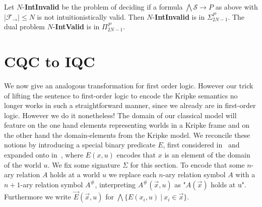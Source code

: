 \documentclass[a4paper,UKenglish,cleveref, autoref, thm-restate]{lipics-v2021}
\begin{document}
\begin{corollary}
	Let $N$-\textbf{IntInvalid} be the problem of deciding if a formula $\bigwedge \mathcal S\to P$ as above with $|\mathcal F_\to|\leq N$ is not intuitionistically valid. Then $N$-\textbf{IntInvalid} is in $\Sigma_{2N-1}^P$. The dual problem $N$-\textbf{IntValid} is in $\Pi_{2N-1}^P$.
\end{corollary}


\section{CQC to IQC}

We now give an analogous transformation for first order logic. However our trick of lifting the sentence to first-order logic to encode the Kripke semantics no longer works in such a straightforward manner, since we already are in first-order logic. However we do it nonetheless! The domain of our classical model will feature on the one hand elements representing worlds in a Kripke frame and on the other hand the domain-elements from the Kripke model. We reconcile these notions by introducing a special binary predicate $E$, first considered in~\cite{baaz2006skolemization} and expanded onto in~\cite{iemhoff2010eskolemization}, where $E(x, u)$ encodes that $x$ is an element of the domain of the world $u$. We fix some signature $\Sigma$ for this section. To encode that some $n$-ary relation $A$ holds at a world $u$ we replace each $n$-ary relation symbol $A$ with a $n+1$-ary relation symbol $A^\#$, interpreting $A^\#(\vec x, u)$ as "$A(\vec x)$ holds at u". Furthermore we write $\vec E(\vec x, u)$ for $\bigwedge\{E(x_i, u)\:|\:x_i\in \vec x\}$.
\end{document}

